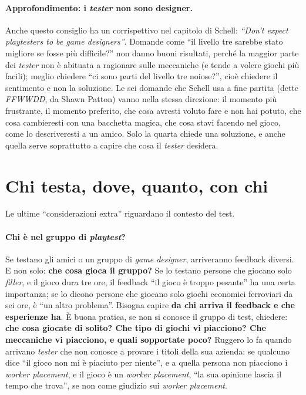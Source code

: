 \paragraph{Approfondimento: i \emph{tester} non sono designer.} Anche questo consiglio ha
un corrispettivo nel capitolo di Schell: \emph{``Don't expect playtesters to be game
designers''}. Domande come ``il livello tre sarebbe stato migliore se fosse più
difficile?'' non danno buoni risultati, perché la maggior parte dei \emph{tester} non è
abituata a ragionare sulle meccaniche (e tende a volere giochi più facili); meglio
chiedere ``ci sono parti del livello tre noiose?'', cioè chiedere il sentimento e non la
soluzione. Le sei domande che Schell usa a fine partita (dette \emph{FFWWDD}, da Shawn
Patton) vanno nella stessa direzione: il momento più frustrante, il momento preferito,
che cosa avresti voluto fare e non hai potuto, che cosa cambieresti con una bacchetta
magica, che cosa stavi facendo nel gioco, come lo descriveresti a un amico. Solo la
quarta chiede una soluzione, e anche quella serve soprattutto a capire che cosa il
\emph{tester} desidera.

\section{Chi testa, dove, quanto, con chi}
\label{a12:sec:contesto}

Le ultime ``considerazioni extra'' riguardano il contesto del test.

\paragraph{Chi è nel gruppo di \emph{playtest}?} Se testano gli amici o un gruppo di
\emph{game designer}, arriveranno feedback diversi. E non solo: \textbf{che cosa gioca il
gruppo?} Se lo testano persone che giocano solo \emph{filler}, e il gioco dura tre ore, il
feedback ``il gioco è troppo pesante'' ha una certa importanza; se lo dicono persone che
giocano solo giochi economici ferroviari da sei ore, è ``un altro problema''. Bisogna
capire \textbf{da chi arriva il feedback e che esperienze ha}. È buona pratica, se non
si conosce il gruppo di test, chiedere: \textbf{che cosa giocate di solito? Che tipo di
giochi vi piacciono? Che meccaniche vi piacciono, e quali sopportate poco?} Ruggero lo fa
quando arrivano \emph{tester} che non conosce a provare i titoli della sua azienda: se
qualcuno dice ``il gioco non mi è piaciuto per niente'', e a quella persona non piacciono
i \emph{worker placement}, e il gioco è un \emph{worker placement}, ``la sua opinione
lascia il tempo che trova'', se non come giudizio sui \emph{worker placement}.

